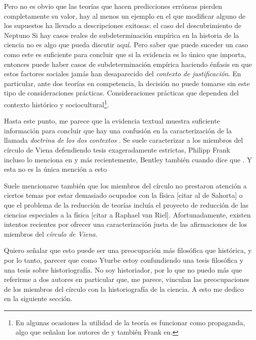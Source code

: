 Pero no es obvio que las teorías que hacen predicciones erróneas pierden completamente su valor, hay al menos un ejemplo en el que modificar alguno de los supuestos ha llevado a descripciones exitosas: el caso del descubrimiento de Neptuno  
Si hay casos reales de subdeterminación empírica en la historia de la ciencia no es algo que pueda discutir aquí.
Pero saber que puede suceder un caso como este es suficiente para concluir que si la evidencia es lo único que importa, entonces puede haber casos de subdeterminación empírica haciendo énfasis en que estos factores sociales jamás han desaparecido del \emph{contexto de justificación}.
En particular, ante dos teorías en competencia, la decisión no puede tomarse sin este tipo de consideraciones prácticas.
Consideraciones prácticas que dependen del contexto histórico y sociocultural\footnote{En algunas ocasiones la utilidad de la teoría es funcionar como propaganda, algo que señalan los autores de \parencite{Lewontin2017}  y también Frank en.}.


Hasta este punto, me parece que la evidencia textual muestra suficiente información para concluir que hay una confusión en la caracterización de la llamada \emph{doctrina de los dos contextos} \parencite{Yturbe1995}.
Se suele caracterizar a los miembros del círculo de Viena defendiendo tesis exageradamente estrictas, Philipp Frank incluso lo menciona en  y más recientemente, Bentley también cuando dice que .
Y esta no es la única mención a esto 


Suele mencionarse también que los miembros del círculo no prestaron atención a ciertos temas por estar demasiado ocupados con la física [citar al de Sahorta] o que el problema de la reducción de teorías incluía el proyecto de reducción de las ciencias especiales a la física [citar a Raphael van Riel].
Afortunadamente, existen intentos recientes por ofrecer una caracterización justa de las afirmaciones de los miembros del \emph{círculo de Viena.}

Quiero señalar que esto puede ser una preocupación más filosófica que histórica, y por lo tanto, parecer que como Yturbe \cite{Yturbe1995} estoy confundiendo una tesis filosófica y una tesis sobre historiografía.
No soy historiador, por lo que no puedo más que referirme a dos autores en particular que, me parece, vinculan las preocupaciones de los miembros del círculo con la historiografía de la ciencia.
A esto me dedico en la siguiente sección.


